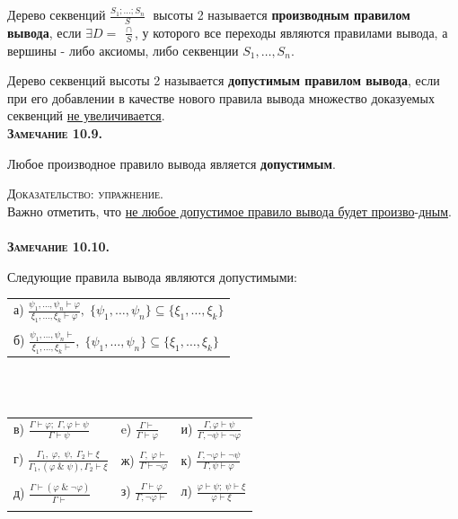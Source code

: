 \documentclass[18pt, a4paper]{extarticle}
\newcommand{\ampersand}{\;\&\;}
\begin{document}
Дерево секвенций $\displaystyle \frac{S_1;\dots;S_n}{S}\;$ высоты 2 называется \textbf{производным правилом вывода}, если $\exists D =\;\displaystyle \frac{\cap}{S}$, у которого все переходы являются правилами вывода, а вершины - либо аксиомы, либо секвенции $S_1,\dots,S_n$.

Дерево секвенций высоты 2 называется \textbf{допустимым правилом вывода}, если при его добавлении в качестве нового правила вывода множество доказуемых секвенций \underline{не увеличивается}.\\

\textbf{\textsc{Замечание 10.9.}} 

Любое производное правило вывода является \textbf{допустимым}.

\textsc{Доказательство: упражнение.} \\

Важно отметить, что \underline{не любое допустимое правило вывода будет произво}-\underline{дным}.\\\\

\textbf{\textsc{Замечание 10.10.}} 

Следующие правила вывода являются допустимыми:\\

\begin{tabular}{l}
а) $\displaystyle \frac{\psi_1,\dots,\psi_n \vdash \varphi}{\xi_1,\dots,\xi_k \vdash \varphi},\;\{\psi_1,\dots,\psi_n\} \subseteq \{\xi_1,\dots,\xi_k\}$\\\\

б) $\displaystyle \frac{\psi_1,\dots,\psi_n \vdash }{\xi_1,\dots,\xi_k \vdash},\;\{\psi_1,\dots,\psi_n\} \subseteq \{\xi_1,\dots,\xi_k\}$
\end{tabular}\leavevmode\\\\

\begin{tabular}{lll}
в) $\displaystyle \frac{\Gamma \vdash \varphi;\;\Gamma, \varphi \vdash \psi }{\Gamma \vdash \psi}$ \qquad& e) $\displaystyle \frac{\Gamma \vdash}{\Gamma \vdash \varphi}$ \qquad & и) $\displaystyle \frac{\Gamma, \varphi\vdash\psi}{\Gamma,\lnot\psi\vdash\lnot\varphi}$\\\\

г) $\displaystyle \frac{\Gamma_1,\;\varphi,\;\psi,\;\Gamma_2 \vdash \xi}{\Gamma_1, (\varphi\ampersand\psi), \Gamma_2 \vdash \xi}$ \qquad & ж) $\displaystyle \frac{\Gamma,\;\varphi\vdash}{\Gamma\vdash\lnot\varphi}$ \qquad & к) $\displaystyle \frac{\Gamma,\lnot\varphi\vdash\lnot\psi}{\Gamma,\psi\vdash\varphi}$\\\\

д) $\displaystyle \frac{\Gamma \vdash (\varphi\ampersand\lnot\varphi)}{\Gamma\vdash}$ \qquad & з) $\displaystyle \frac{\Gamma\vdash\varphi}{\Gamma,\lnot\varphi\vdash}$ & л) $\displaystyle \frac{\varphi\vdash\psi;\;\psi\vdash\xi}{\varphi\vdash\xi}$\\\\
\end{tabular}\leavevmode\\
\end{document}
